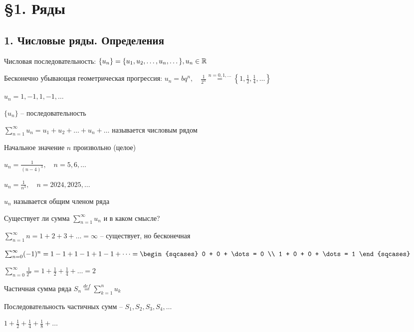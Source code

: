 \documentclass[12pt]{article}
\begin{document}
    \section{\S 1. Ряды}

    \subsection{1. Числовые ряды. Определения}

    \Mems Числовая последовательность: $\{u_n\} = \{u_1, u_2, \dots, u_n, \dots\}, u_n \in \mathbb{R}$

     Бесконечно убывающая геометрическая прогрессия: $u_n = b q^n, \quad
    \frac{1}{2^n} \stackrel{n = 0,1,\dots}{=} \left\{1, \frac{1}{2}, \frac{1}{4}, \dots\right\}$

     $u_n = 1, -1, 1, -1, \dots$

    \hypertarget{numberseriesdefinition}{}

    \Def $\{u_n\}$ -- последовательность

    $\sum_{n = 1}^{\infty} u_n = u_1 + u_2 + \dots + u_n + \dots$ называется числовым рядом

    \Notas Начальное значение $n$ произвольно (целое)

    \Ex $u_n = \frac{1}{(n - 4)^3}, \quad n = 5, 6, \dots$

    $u_n = \frac{1}{n^3}, \quad n = 2024, 2025, \dots$

    \Notas $u_n$ называется общим членом ряда

    \Nota Существует ли сумма $\sum_{n = 1}^{\infty} u_n$ и в каком смысле?

     $\sum_{n = 1}^{\infty} n = 1 + 2 + 3 + \dots = \infty$ -- существует, но бесконечная

     $\sum_{n = 0}^{\infty} (-1)^n = 1 - 1 + 1 - 1 + 1 - 1 + \dots =
    \begin{sqcases}
        0 + 0 + \dots = 0 \\
        1 + 0 + 0 + \dots = 1
    \end{sqcases}$

     $\sum_{n = 0}^\infty \frac{1}{2^n} = 1 + \frac{1}{2} + \frac{1}{4} + \dots = 2$

    \Def Частичная сумма ряда $S_n \stackrel{def}{=} \sum_{k = 1}^{n} u_k$

    \Notas Последовательность частичных сумм -- $S_1, S_2, S_3, S_4, \dots$

    \Ex $1 + \frac{1}{2} + \frac{1}{4} + \frac{1}{8} + \dots$
\end{document}
